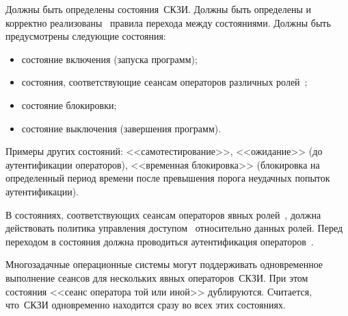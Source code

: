 \label{R.AC.States} %
Должны быть определены состояния~СКЗИ. Должны быть определены и 
корректно реализованы~ правила 
перехода между состояниями. Должны быть предусмотрены следующие состояния:
\begin{itemize}
\item
состояние включения (запуска программ);
\item
состояния, соответствующие сеансам операторов различных ролей~;
\item
состояние блокировки;
\item
состояние выключения (завершения программ).
\end{itemize}

\begin{note*}
Примеры других состояний: <<самотестирование>>,
<<ожидание>> (до аутентификации операторов),
<<временная блокировка>> (блокировка на определенный период времени
после превышения порога неудачных попыток аутентификации).
\end{note*}

\label{R.AC.OpStates} %
В состояниях, соответствующих сеансам операторов явных
ролей~, должна действовать политика управления 
доступом~ относительно данных ролей.
%
Перед переходом в состояния должна проводиться аутентификация
операторов~.

\begin{note*}
Многозадачные операционные системы могут поддерживать 
одновременное выполнение сеансов для нескольких явных операторов~СКЗИ.
При этом состояния <<сеанс оператора той или иной>> дублируются. 
Считается, что~СКЗИ одновременно находится сразу во всех этих состояниях. 
%
\end{note*}

